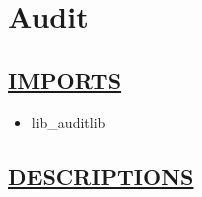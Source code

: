 \chapter*{Audit}
\hypertarget{ecldoc:toc:Audit}{}

\section*{\underline{IMPORTS}}
\begin{itemize}
\item lib\_auditlib
\end{itemize}

\section*{\underline{DESCRIPTIONS}}

